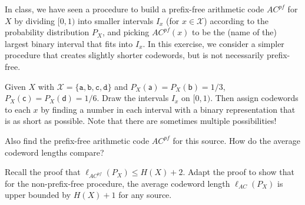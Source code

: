 \documentclass[a4paper,10pt,landscape,twocolumn]{scrartcl}
\begin{document}
\begin{exercise}
In class, we have seen a procedure to build a prefix-free arithmetic code $AC^{pf}$ for $X$ by dividing $[0,1)$ into smaller intervals $I_x$ (for $x \in \mathcal{X}$) according to the probability distribution $P_X$, and picking $AC^{pf}(x)$ to be the (name of the) largest binary interval that fits into $I_x$. In this exercise, we consider a simpler procedure that creates slightly shorter codewords, but is not necessarily prefix-free.
	\begin{subex}
	Given $X$ with $\mathcal{X} = \{\mathtt{a,b,c,d}\}$ and $P_X(\mathsf{a}) = P_X(\mathsf{b}) = 1/3$, $P_X(\mathsf{c}) = P_X(\mathsf{d}) = 1/6$. Draw the intervals $I_x$ on $[0,1)$. Then assign codewords to each $x$ by finding a number in each interval with a binary representation that is as short as possible. Note that there are sometimes multiple possibilities!
	\end{subex}
	\begin{subex}
	Also find the prefix-free arithmetic code $AC^{pf}$ for this source. How do the average codeword lengths compare?
	\end{subex}
	\begin{subex}
	Recall the proof that $\ell_{AC^{pf}}(P_X) \leq H(X) + 2$. Adapt the proof to show that for the non-prefix-free procedure, the average codeword length $\ell_{AC}(P_X)$ is upper bounded by $H(X) + 1$ for any source.
	\end{subex}
\end{exercise}
\end{document}
